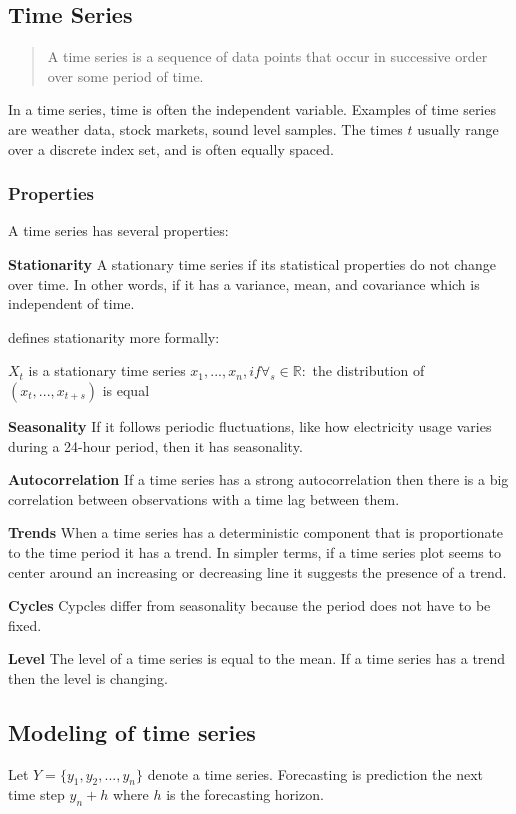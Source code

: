 \subsection{Time Series}
\label{sec:time-series}
\begin{quote}
    A time series is a sequence of data
    points that occur in successive order over some period of time.
\end{quote}
\cite{Hayes}

In a time series, time is often the independent variable.
Examples of time series are weather data, stock markets, sound level samples.
The times $t$ usually range over a discrete index set, and is often equally spaced.

\subsubsection{Properties}
A time series has several properties:

\textbf{Stationarity}
A stationary time series if its statistical properties do not change over time.
In other words, if it has a variance, mean, and covariance which is independent of time.

\cite{RobJHyndman2014} defines stationarity more formally:
\begin{definition}
   $X_t$ is a stationary time series 
   $x_1, ..., x_n, if \forall_s \in \mathbb{R} :$
   the distribution of $(x_t, ..., x_{t+s})$ is equal
\end{definition}

\textbf{Seasonality}
If it follows periodic fluctuations, like how electricity usage varies during a 24-hour period,
then it has seasonality.

\textbf{Autocorrelation}
If a time series has a strong autocorrelation then there is a big
correlation between observations with a time lag between them.

\textbf{Trends}
When a time series has a deterministic component that is proportionate to the time period it has a trend.
In simpler terms, if a time series plot seems to center around an increasing or decreasing line it suggests the presence of a trend.

\textbf{Cycles}
Cypcles differ from seasonality because the period does not have to be fixed.


\textbf{Level}
The level of a time series is equal to the mean. If a time series has a trend
then the level is changing.


\subsection{Modeling of time series}
Let  $Y = \{y_1, y_2, ..., y_n\}$ denote a time series.
Forecasting is prediction the next time step $y_n+h$ where $h$ is the forecasting horizon.

